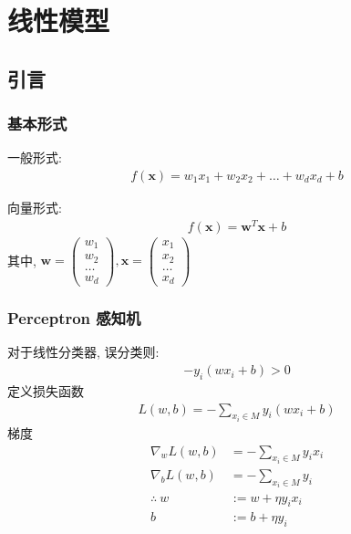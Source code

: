\newpage
\section{线性模型}

\subsection{引言}
\subsubsection{基本形式}
一般形式:
\begin{align*}
    f(\bm{x})=w_1x_1+w_2x_2+\dots+w_dx_d+b
\end{align*}

向量形式:
\begin{align*}
    f(\bm{x})=\bm w ^T \bm x+b
\end{align*}
其中, $\bm w=\begin{pmatrix}
    w_1 \\w_2\\ \dots \\ w_d
\end{pmatrix}, \bm x=\begin{pmatrix}
    x_1 \\x_2\\ \dots \\ x_d
\end{pmatrix}$

\subsubsection{Perceptron 感知机}
对于线性分类器, 误分类则:
\begin{align*}
    -y_i(wx_i+b)>0
\end{align*}
定义损失函数 
\begin{align*}
    L(w,b)=-\sum_{x_i\in M}y_i(wx_i+b)
\end{align*}
梯度
\begin{align*}
    \nabla_w L(w,b)&=-\sum_{x_i\in M}y_ix_i\\
    \nabla_b L(w,b)&=-\sum_{x_i\in M}y_i\\
    \therefore\ w&:=w+\eta y_ix_i\\
    b&:= b+\eta y_i
\end{align*}

